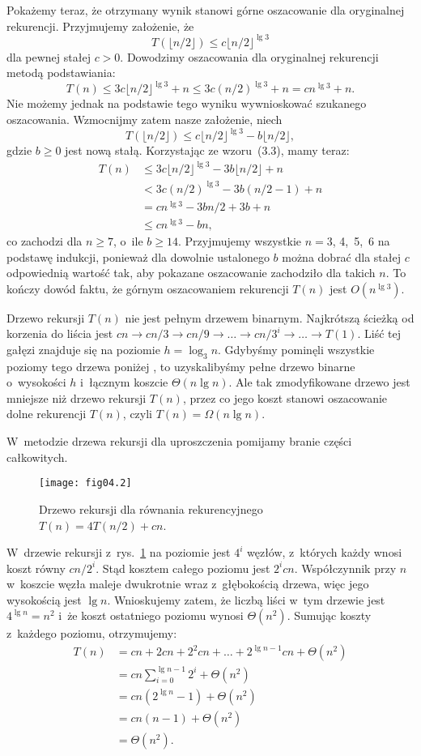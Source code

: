 Pokażemy teraz, że otrzymany wynik stanowi górne oszacowanie dla oryginalnej rekurencji. Przyjmujemy założenie, że
\[
    T(\lfloor n/2\rfloor)\le c\lfloor n/2\rfloor^{\lg3}
\]
dla pewnej stałej $c>0$. Dowodzimy oszacowania dla oryginalnej rekurencji metodą podstawiania:
\[
	T(n) \le 3c\lfloor n/2\rfloor^{\lg3}+n \le 3c(n/2)^{\lg3}+n = cn^{\lg3}+n.
\]
Nie możemy jednak na podstawie tego wyniku wywnioskować szukanego oszacowania. Wzmocnijmy zatem nasze założenie, niech
\[
	T(\lfloor n/2\rfloor) \le c\lfloor n/2\rfloor^{\lg3}-b\lfloor n/2\rfloor,
\]
gdzie $b\ge0$ jest nową stałą. Korzystając ze wzoru~(3.3), mamy teraz:
\begin{align*}
	T(n) &\le 3c\lfloor n/2\rfloor^{\lg3}-3b\lfloor n/2\rfloor+n \\
	&< 3c(n/2)^{\lg3}-3b(n/2-1)+n \\
	&= cn^{\lg3}-3bn/2+3b+n \\
	&\le cn^{\lg3}-bn,
\end{align*}
co zachodzi dla $n\ge7$, o~ile $b\ge14$. Przyjmujemy wszystkie $n=3$, 4,~5,~6 na podstawę indukcji, ponieważ dla dowolnie ustalonego $b$ można dobrać dla stałej $c$ odpowiednią wartość tak, aby pokazane oszacowanie zachodziło dla takich $n$. To kończy dowód faktu, że górnym oszacowaniem rekurencji $T(n)$ jest $O(n^{\lg3})$.

\exercise %
Drzewo rekursji $T(n)$ nie jest pełnym drzewem binarnym. Najkrótszą ścieżką od korzenia do liścia jest $cn\to cn/3\to cn/9\to\dots\to cn/3^i\to\dots\to T(1)$. Liść tej gałęzi znajduje się na poziomie $h=\log_3n$. Gdybyśmy pominęli wszystkie poziomy tego drzewa poniżej , to uzyskalibyśmy pełne drzewo binarne o~wysokości $h$ i~łącznym koszcie $\Theta(n\lg n)$. Ale tak zmodyfikowane drzewo jest mniejsze niż drzewo rekursji $T(n)$, przez co jego koszt stanowi oszacowanie dolne rekurencji $T(n)$, czyli $T(n)=\Omega(n\lg n)$.

\exercise %
W~metodzie drzewa rekursji dla uproszczenia pomijamy branie części całkowitych.
\begin{figure}[ht]
	\begin{center}
		\texttt{[image: fig04.2]}
	\end{center}
	\caption{Drzewo rekursji dla równania rekurencyjnego $T(n)=4T(n/2)+cn$.} \label{fig:4.2-3}
\end{figure}
W~drzewie rekursji z~rys.~\ref{fig:4.2-3} na  poziomie jest $4^i$ węzłów, z~których każdy wnosi koszt równy $cn/2^i$. Stąd kosztem całego poziomu jest $2^icn$. Współczynnik przy $n$ w~koszcie węzła maleje dwukrotnie wraz z~głębokością drzewa, więc jego wysokością jest $\lg n$. Wnioskujemy zatem, że liczbą liści w~tym drzewie jest $4^{\lg n}=n^2$ i~że koszt ostatniego poziomu wynosi $\Theta(n^2)$. Sumując koszty z~każdego poziomu, otrzymujemy:
\begin{align*}
	T(n) &= cn+2cn+2^2cn+\dots+2^{\lg n-1}cn+\Theta(n^2) \\
	&= cn\sum_{i=0}^{\lg n-1}2^i+\Theta(n^2) \\
	&= cn(2^{\lg n}-1)+\Theta(n^2) \\
	&= cn(n-1)+\Theta(n^2) \\
	&= \Theta(n^2).
\end{align*}

